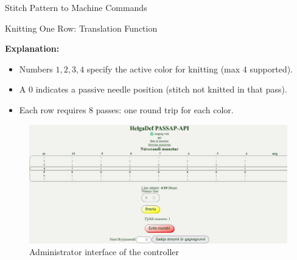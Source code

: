 \documentclass[
    NAME={Dr. Helga Ingimundardóttir},
    EMAIL={helgaingim@hi.is},
    FACULTY={Industrial Engineering},
    TITLE={HiDef Textiles: Reviving Tradition with Innovation},
    SUBTITLE={Empowering Creativity and Sustainability in Textile Production through Digital Transformation},
    SEMINAR={Reykjavík DataBeers},
    DATE={January 25, 2025},
    WIDE={true}
]{HI-LaTeX/hi-beamer}
\begin{document}
\begin{frame}[allowframebreaks]{Stitch Pattern to Machine Commands}
    \begin{exampleblock}{Knitting One Row: Translation Function}
        \centering
    \end{exampleblock}
    \vspace{1em}
    \textbf{Explanation:}
    \begin{itemize}
        \item Numbers \(1, 2, 3, 4\) specify the active color for knitting (max 4 supported).
        \item A \(0\) indicates a passive needle position (stitch not knitted in that pass).
        \item Each row requires 8 passes: one round trip for each color.
    \end{itemize}
    \framebreak
    \begin{figure}
        \centering
        \includegraphics[width=.9\linewidth]{include/passapiscreen.png}
        \caption{Administrator interface of the controller}
    \end{figure}
\end{frame}
\end{document}
